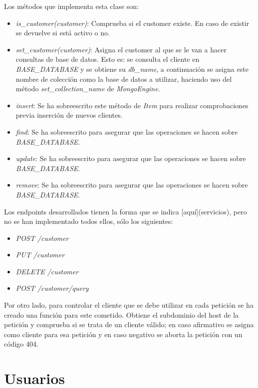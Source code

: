\bigskip
Los métodos que implementa esta clase son:
\begin{itemize}
	\item \textit{is\_customer(customer)}: Comprueba si el customer existe. En caso de existir se devuelve si está activo o no.
	\item \textit{set\_customer(customer)}: Asigna el customer al que se le van a hacer consultas de base de datos. Esto es: se consulta el cliente en \textit{BASE\_DATABASE} y se obtiene su \textit{db\_name}, a continuación se asigna este nombre de colección como la base de datos a utilizar, haciendo uso del método \textit{set\_collection\_name} de \textit{MongoEngine}.
	\item \textit{insert}: Se ha sobreescrito este método de \textit{Item} para realizar comprobaciones previa inserción de nuevos clientes.
	\item \textit{find}: Se ha sobreescrito para asegurar que las operaciones se hacen sobre \textit{BASE\_DATABASE}.
	\item \textit{update}: Se ha sobreescrito para asegurar que las operaciones se hacen sobre \textit{BASE\_DATABASE}.
	\item \textit{remove}: Se ha sobreescrito para asegurar que las operaciones se hacen sobre \textit{BASE\_DATABASE}.
\end{itemize}


\bigskip
Los endpoints desarrollados tienen la forma que se indica [aquí](servicios), pero no se han implementado todos ellos, sólo los siguientes:
\begin{itemize}
	\item \textit{POST /customer}
	\item \textit{PUT /customer}
	\item \textit{DELETE /customer}
	\item \textit{POST /customer/query}
\end{itemize}


\bigskip
Por otro lado, para controlar el cliente que se debe utilizar en cada petición se ha creado una función para este cometido. Obtiene el subdominio del host de la petición y comprueba si se trata de un cliente válido; en caso afirmativo se asigna como cliente para esa petición y en caso negativo se aborta la petición con un código 404.




\section{Usuarios}


